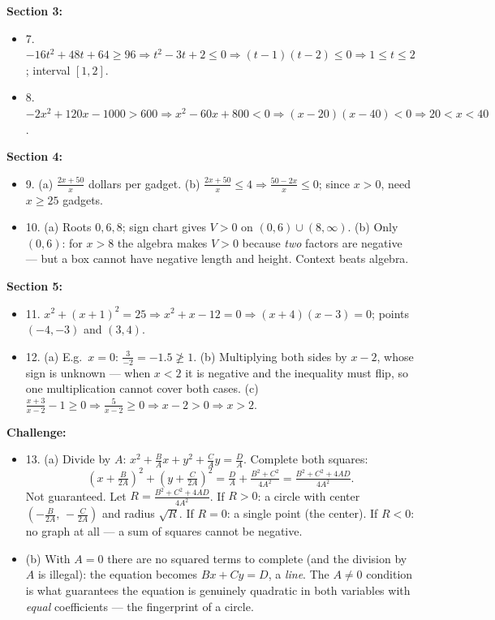 \documentclass[12pt]{article}
\begin{document}
\textbf{Section 3:}
\begin{itemize}\itemsep2pt
  \item 7. $-16t^2+48t+64 \ge 96 \Rightarrow t^2-3t+2 \le 0 \Rightarrow (t-1)(t-2)\le 0 \Rightarrow 1 \le t \le 2$; interval $[1,2]$.
  \item 8. $-2x^2+120x-1000 > 600 \Rightarrow x^2-60x+800<0 \Rightarrow (x-20)(x-40)<0 \Rightarrow 20 < x < 40$.
\end{itemize}

\textbf{Section 4:}
\begin{itemize}\itemsep2pt
  \item 9. (a) $\frac{2x+50}{x}$ dollars per gadget. (b) $\frac{2x+50}{x}\le 4 \Rightarrow \frac{50-2x}{x}\le 0$; since $x>0$, need $x \ge 25$ gadgets.
  \item 10. (a) Roots $0, 6, 8$; sign chart gives $V>0$ on $(0,6)\cup(8,\infty)$. (b) Only $(0,6)$: for $x>8$ the algebra makes $V>0$ because \emph{two} factors are negative --- but a box cannot have negative length and height. Context beats algebra.
\end{itemize}

\textbf{Section 5:}
\begin{itemize}\itemsep2pt
  \item 11. $x^2+(x+1)^2=25 \Rightarrow x^2+x-12=0 \Rightarrow (x+4)(x-3)=0$; points $(-4,-3)$ and $(3,4)$.
  \item 12. (a) E.g.\ $x=0$: $\frac{3}{-2} = -1.5 \not\ge 1$. (b) Multiplying both sides by $x-2$, whose sign is unknown --- when $x<2$ it is negative and the inequality must flip, so one multiplication cannot cover both cases. (c) $\frac{x+3}{x-2}-1 \ge 0 \Rightarrow \frac{5}{x-2} \ge 0 \Rightarrow x-2>0 \Rightarrow x>2$.
\end{itemize}

\textbf{Challenge:}
\begin{itemize}\itemsep2pt
  \item 13. (a) Divide by $A$: $x^2+\tfrac{B}{A}x+y^2+\tfrac{C}{A}y=\tfrac{D}{A}$. Complete both squares:
  \[
    \left(x+\tfrac{B}{2A}\right)^2+\left(y+\tfrac{C}{2A}\right)^2 = \tfrac{D}{A}+\tfrac{B^2+C^2}{4A^2} = \tfrac{B^2+C^2+4AD}{4A^2}.
  \]
  Not guaranteed. Let $R = \tfrac{B^2+C^2+4AD}{4A^2}$. If $R>0$: a circle with center $\left(-\tfrac{B}{2A},\,-\tfrac{C}{2A}\right)$ and radius $\sqrt{R}$. If $R=0$: a single point (the center). If $R<0$: no graph at all --- a sum of squares cannot be negative.
  \item (b) With $A=0$ there are no squared terms to complete (and the division by $A$ is illegal): the equation becomes $Bx+Cy=D$, a \emph{line}. The $A\neq 0$ condition is what guarantees the equation is genuinely quadratic in both variables with \emph{equal} coefficients --- the fingerprint of a circle.
\end{itemize}
\end{document}
